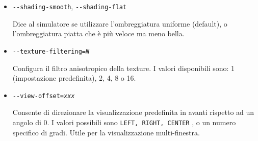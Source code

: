 {\begin{itemize}
  Definisce la risoluzione della finestra/schermo.
  Ad esempio \texttt{-$ $-geometry=1024x768}..

  \item{\texttt{-$ $-shading-smooth}, \texttt{-$ $-shading-flat}}

  Dice al simulatore se utilizzare l'ombreggiatura uniforme (default), o
  l'ombreggiatura piatta che \`{e} pi\`{u} veloce ma meno bella.

  \item{\texttt{-$ $-texture-filtering={\it N}}}

  Configura il filtro anisotropico della texture. I valori disponibili sono: 1
  (impostazione predefinita), 2, 4, 8 o 16.

  \item{\texttt{-$ $-view-offset={\it xxx}}}

  Consente di direzionare la visualizzazione predefinita in avanti
  rispetto ad un angolo di 0. I valori possibili sono \texttt{LEFT, RIGHT, CENTER}
  , o un numero specifico di gradi. Utile per la visualizzazione multi-finestra.

  \end{itemize}

}

